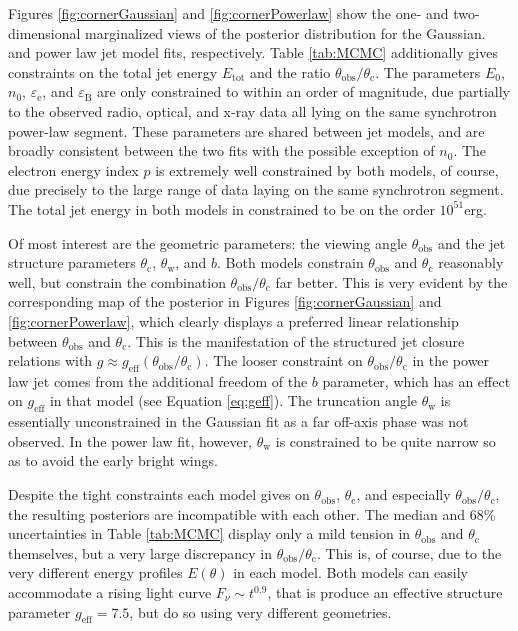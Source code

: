 \documentclass[twocolumn]{aastex62}
\newcommand{\gwbns}{GW170817A}
\newcommand{\thobs}{\ensuremath{\theta_{\mathrm{obs}}}}
\newcommand{\thW}{\ensuremath{\theta_{\mathrm{w}}}}
\newcommand{\thC}{\ensuremath{\theta_{\mathrm{c}}}}
\newcommand{\epse}{\ensuremath{\varepsilon_{\mathrm{e}}}}
\newcommand{\epsB}{\ensuremath{\varepsilon_{\mathrm{B}}}}
\newcommand{\Etot}{\ensuremath{E_{\mathrm{tot}}}}
\newcommand{\geff}{\ensuremath{g_{\mathrm{eff}}}}
\begin{document}
\begin{figure*}
	\caption{Views of the posterior parameter distribution for a power law jet fit to the \gwbns{} afterglow.  The diagonal contains one-dimensional marginalized posteriors for each fit parameter, while the off-diagonal plots contain two-dimensional maps of the posterior marginalized over all but the two corresponding parameters. \label{fig:cornerPowerlaw}}
\end{figure*}

Figures \ref{fig:cornerGaussian} and \ref{fig:cornerPowerlaw} show the one- and two-dimensional marginalized views of the posterior distribution for the Gaussian. and power law jet model fits, respectively.  Table \ref{tab:MCMC} additionally gives constraints on the total jet energy \Etot{} and the ratio $\thobs/\thC$. The parameters $E_0$, $n_0$, $\epse$, and $\epsB$ are only constrained to within an order of magnitude, due partially to the observed radio, optical, and x-ray data all lying on the same synchrotron power-law segment.  These parameters are shared between jet models, and are broadly consistent between the two fits with the possible exception of $n_0$.  The electron energy index $p$ is extremely well constrained by both models, of course, due precisely to the large range of data laying on the same synchrotron segment.  The total jet energy in both models in constrained to be on the order $10^{51}$erg.

Of most interest are the geometric parameters: the viewing angle $\thobs$ and the jet structure parameters $\thC$, $\thW$, and $b$.  Both models constrain $\thobs$ and $\thC$ reasonably well, but constrain the combination $\thobs/\thC$ far better.  This is very evident by the corresponding map of the posterior in Figures \ref{fig:cornerGaussian} and \ref{fig:cornerPowerlaw}, which clearly displays a preferred linear relationship between $\thobs$ and $\thC$.  This is the manifestation of the structured jet closure relations with $g \approx \geff(\thobs/\thC)$.  The looser constraint on $\thobs/\thC$ in the power law jet comes from the additional freedom of the $b$ parameter, which has an effect on $\geff$ in that model (see Equation \eqref{eq:geff}). The truncation angle $\thW$ is essentially unconstrained in the Gaussian fit as a far off-axis phase was not observed.  In the power law fit, however, $\thW$ is constrained to be quite narrow so as to avoid the early bright wings.

Despite the tight constraints each model gives on $\thobs$, $\thC$, and especially $\thobs/\thC$, the resulting posteriors are incompatible with each other.  The median and 68\% uncertainties in Table \ref{tab:MCMC} display only a mild tension in $\thobs$  and $\thC$ themselves, but a very large discrepancy in $\thobs/\thC$.  This is, of course, due to the very different energy profiles $E(\theta)$ in each model.  Both models can easily accommodate a rising light curve $F_\nu \sim t^{0.9}$, that is produce an effective structure parameter $\geff = 7.5$, but do so using very different geometries.  
\end{document}
